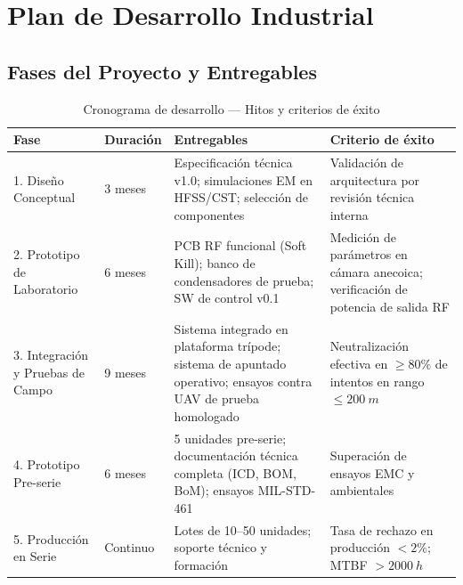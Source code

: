 \documentclass[12pt,a4paper]{article}
\begin{document}
\newpage

\section{Plan de Desarrollo Industrial}

\subsection{Fases del Proyecto y Entregables}

\begin{table}[H]
\centering
\caption{Cronograma de desarrollo — Hitos y criterios de éxito}
\label{tab:cronograma}
\renewcommand{\arraystretch}{1.3}
\begin{tabularx}{\textwidth}{lXXX}
\toprule
\textbf{Fase} &
\textbf{Duración} &
\textbf{Entregables} &
\textbf{Criterio de éxito} \\
\midrule
1. Diseño Conceptual &
  3 meses &
  Especificación técnica v1.0;
  simulaciones EM en HFSS/CST;
  selección de componentes &
  Validación de arquitectura por revisión técnica interna \\[4pt]

2. Prototipo de Laboratorio &
  6 meses &
  PCB RF funcional (Soft Kill);
  banco de condensadores de prueba;
  SW de control v0.1 &
  Medición de parámetros en cámara anecoica;
  verificación de potencia de salida RF \\[4pt]

3. Integración y Pruebas de Campo &
  9 meses &
  Sistema integrado en plataforma trípode;
  sistema de apuntado operativo;
  ensayos contra UAV de prueba homologado &
  Neutralización efectiva en $\geq 80\%$ de intentos
  en rango $\leq \SI{200}{m}$ \\[4pt]

4. Prototipo Pre-serie &
  6 meses &
  5 unidades pre-serie;
  documentación técnica completa (ICD, BOM, BoM);
  ensayos MIL-STD-461 &
  Superación de ensayos EMC y ambientales \\[4pt]

5. Producción en Serie &
  Continuo &
  Lotes de 10–50 unidades;
  soporte técnico y formación &
  Tasa de rechazo en producción $< 2\%$;
  MTBF $> \SI{2000}{h}$ \\
\bottomrule
\end{tabularx}
\end{table}
\end{document}
